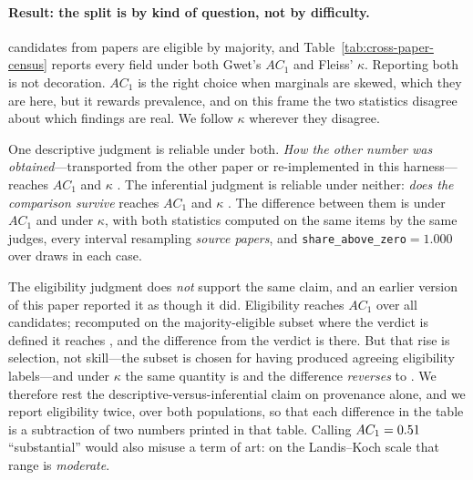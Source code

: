\documentclass[11pt]{article}
\begin{document}


\paragraph{Result: the split is by kind of question, not by difficulty.}
\CensusEligible{} candidates from \CensusPapers{} papers are eligible by
majority, and Table~\ref{tab:cross-paper-census} reports every field under both
Gwet's $AC_1$ and Fleiss' $\kappa$. Reporting both is not decoration. $AC_1$ is
the right choice when marginals are skewed, which they are here, but it rewards
prevalence, and on this frame the two statistics disagree about which findings
are real. We follow $\kappa$ wherever they disagree.

One descriptive judgment is reliable under both. \emph{How the other number was
obtained}---transported from the other paper or re-implemented in this
harness---reaches $AC_1$ \DecProv{} and $\kappa$ \DecProvK{}. The inferential
judgment is reliable under neither: \emph{does the comparison survive} reaches
$AC_1$ \DecVerdict{} and $\kappa$ \DecVerdictK{}. The difference between them is
\DecGap{} \DecGapCI{} under $AC_1$ and \DecGapK{} \DecGapKCI{} under $\kappa$,
with both statistics computed on the same items by the same judges, every
interval resampling \emph{source papers}, and
\texttt{share\_above\_zero}$=1.000$ over \DecDraws{} draws in each case.

The eligibility judgment does \emph{not} support the same claim, and an earlier
version of this paper reported it as though it did. Eligibility reaches $AC_1$
\DecElig{} over all \CensusHeldout{} candidates; recomputed on the
majority-eligible subset where the verdict is defined it reaches \DecEligM{},
and the difference from the verdict is \DecGapEl{} there. But that rise is
selection, not skill---the subset is chosen for having produced agreeing
eligibility labels---and under $\kappa$ the same quantity is \DecEligMK{} and
the difference \emph{reverses} to \DecGapElK{} \DecGapElKCI{}. We therefore rest
the descriptive-versus-inferential claim on provenance alone, and we report
eligibility twice, over both populations, so that each difference in the table
is a subtraction of two numbers printed in that table. Calling $AC_1=0.51{}$
``substantial'' would also misuse a term of art: on the Landis--Koch scale that
range is \emph{moderate}.
\end{document}
